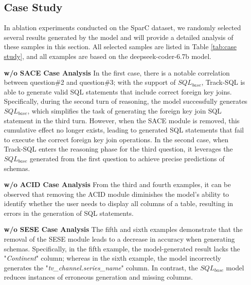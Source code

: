\documentclass[11pt]{article}
\begin{document}
\subsection{Case Study}
\label{sec:case study}
In ablation experiments conducted on the SparC dataset, we randomly selected several results generated by the model and will provide a detailed analysis of these samples in this section. All selected samples are listed in Table \ref{tab:case study}, and all examples are based on the deepseek-coder-6.7b model.

\noindent\textbf{w/o SACE Case Analysis }
In the first case, there is a notable correlation between question\#2 and question\#3; with the support of $SQL_{base}$, Track-SQL is able to generate valid SQL statements that include correct foreign key joins. Specifically, during the second turn of reasoning, the model successfully generates $SQL_{base}$, which simplifies the task of generating the foreign key join SQL statement in the third turn. However, when the SACE module is removed, this cumulative effect no longer exists, leading to generated SQL statements that fail to execute the correct foreign key join operations. In the second case, when Track-SQL enters the reasoning phase for the third question, it leverages the $SQL_{base}$ generated from the first question to achieve precise predictions of schemas.

\noindent\textbf{w/o ACID Case Analysis }
From the third and fourth examples, it can be observed that removing the ACID module diminishes the model's ability to identify whether the user needs to display all columns of a table, resulting in errors in the generation of SQL statements.

\noindent\textbf{w/o SESE Case Analysis }
The fifth and sixth examples demonstrate that the removal of the SESE module leads to a decrease in accuracy when generating schemas. Specifically, in the fifth example, the model-generated result lacks the "\textit{Continent}" column; whereas in the sixth example, the model incorrectly generates the "\textit{tv\_channel.series\_name}" column. In contrast, the $SQL_{base}$ model reduces instances of erroneous generation and missing columns.
\end{document}
